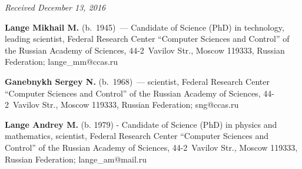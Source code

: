 \vspace*{-3pt}

\hfill{\small\textit{Received December 13, 2016}}
\Contr

\noindent
\textbf{Lange Mikhail M.} (b.\ 1945)~--- Candidate of Science (PhD) in technology, leading 
scientist, Federal Research Center ``Computer Sciences and Control'' of the Russian Academy of 
Sciences, 44-2~Vavilov Str., Moscow 119333, Russian Federation; \mbox{lange\_mm@ccas.ru} 

\vspace*{3pt}
  
\noindent
\textbf{Ganebnykh Sergey N.} (b.\ 1968)~--- scientist, Federal Research Center ``Computer 
Sciences and Control'' of the Russian Academy of Sciences, 44-2~Vavilov Str., Moscow 119333, 
Russian Federation; \mbox{sng@ccas.ru}

\vspace*{3pt}

\noindent
\textbf{Lange Andrey M.} (b. 1979) - Candidate of Science (PhD) in physics and mathematics, 
scientist, Federal Research Center ``Computer Sciences and Control'' of the Russian Academy of 
Sciences, 44-2~Vavilov Str., Moscow 119333, Russian Federation; \mbox{lange\_am@mail.ru}
\label{end\stat}


\renewcommand{\bibname}{\protect\rm Литература} 